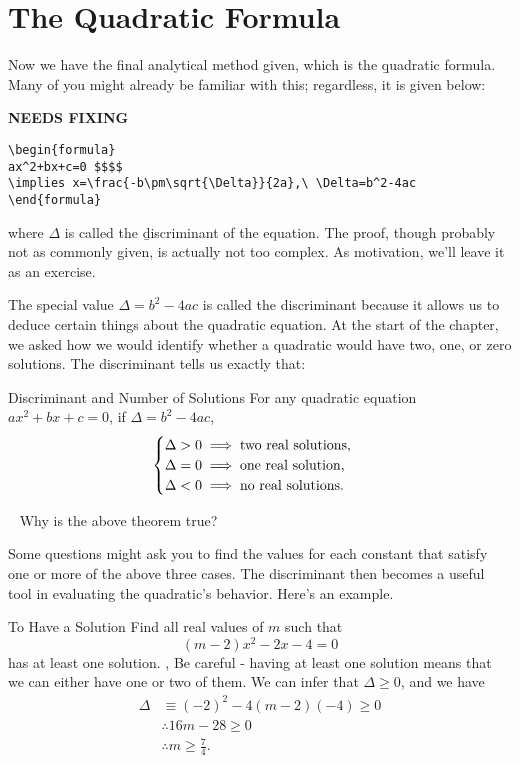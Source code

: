 \section{The Quadratic Formula}
Now we have the final analytical method given, which is the \b{quadratic formula}. Many of you might already be familiar with this; regardless, it is given below:

{\hfill\Large\bfseries NEEDS FIXING\hfill}
\begin{lstlisting}
\begin{formula}
ax^2+bx+c=0 $$$$
\implies x=\frac{-b\pm\sqrt{\Delta}}{2a},\ \Delta=b^2-4ac
\end{formula}
 \end{lstlisting}
where $\Delta$ is called the \b{discriminant} of the equation. The proof, though probably not as commonly given, is actually not too complex. As motivation, we'll leave it as an exercise.

The special value $\Delta=b^2-4ac$ is called the discriminant because it allows us to deduce certain things about the quadratic equation. At the start of the chapter, we asked how we would identify whether a quadratic would have two, one, or zero solutions. The discriminant tells us exactly that:

\begin{theorem}{Discriminant and Number of Solutions}
For any quadratic equation $ax^2+bx+c=0$, if $\Delta=b^2-4ac$,
$$\begin{cases}
    \Delta>0\implies\text{two real solutions,} \\
    \Delta=0\implies\text{one real solution,} \\
    \Delta<0\implies\text{no real solutions.}
\end{cases}$$
\end{theorem}
\begin{thinking}{~}
Why is the above theorem true?
\end{thinking}
Some questions might ask you to find the values for each constant that satisfy one or more of the above three cases. The discriminant then becomes a useful tool in evaluating the quadratic's behavior. Here's an example.
\begin{example}{To Have a Solution}
Find all real values of $m$ such that $$(m-2)x^2-2x-4=0$$ has at least one solution.
\sep
Be careful - having at least one solution means that we can either have one or two of them. We can infer that $\Delta\geq0$, and we have
\begin{align}
    \Delta&\equiv(-2)^2-4(m-2)(-4)\geq0 \\
    &\therefore16m-28\geq0 \\
    &\therefore m\geq\frac74.
\end{align}
\end{example}

